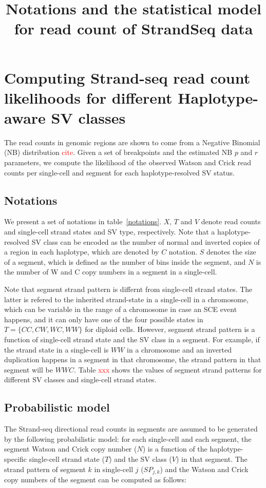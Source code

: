 \documentclass[12pt]{article}
\title{Notations and the statistical model for read count of StrandSeq data}
\renewcommand{\j}{j} %
\newcommand{\X}{X} %
\renewcommand{\k}{k} %
\newcommand{\T}{T} %
\newcommand{\V}{V} %
\begin{document}
\maketitle

\section{Computing Strand-seq read count likelihoods for different Haplotype-aware SV classes}

The read counts in genomic regions are shown to come from a Negative Binomial (NB) distribution \textcolor{red}{cite}. %
Given a set of breakpoints and the estimated NB $p$ and $r$ parameters, we compute the likelihood of the observed Watson and Crick read counts per single-cell and segment for each haplotype-resolved SV status.

\subsection{Notations}
We present a set of notations in table~\ref{notations}. $\X$, $\T$ and $\V$ denote read counts and single-cell strand states and SV type, respectively.
Note that a haplotype-resolved SV class can be encoded as the number of normal and inverted copies of a region in each haplotype, which are denoted by $C$ notation.
$S$ denotes the size of a segment, which is defined as the number of bins inside the segment, and $N$ is the number of W and C copy numbers in a segment in a single-cell.

Note that segment strand pattern is differnt from single-cell strand states.
The latter is refered to the inherited strand-state in a single-cell in a chromosome, which can be variable in the range of a chromosome in case an SCE event happens, and it can only have one of the four possible states in $\T = \{CC,CW,WC,WW\}$ for diploid cells.
However, segment strand pattern is a function of single-cell strand state and the SV class in a segment.
For example, if the strand state in a single-cell is $WW$ in a chromosome and an inverted duplication happens in a segment in that chromosome, the strand pattern in that segment will be $WWC$.
Table \textcolor{red}{xxx} shows the values of segment strand patterns for different SV classes and single-cell strand states.

\subsection{Probabilistic model}
The Strand-seq directional read counts in segments are assumed to be generated by the following probabilistic model:
for each single-cell and each segment, the segment Watson and Crick copy number ($N$) is a function of the haplotype-specific single-cell strand state ($T$) and the SV class ($V$) in that segment. The strand pattern of segment $\k$ in single-cell $\j$ ($SP_{\j,\k}$) and the Watson and Crick copy numbers of the segment can be computed as follows:
\end{document}
